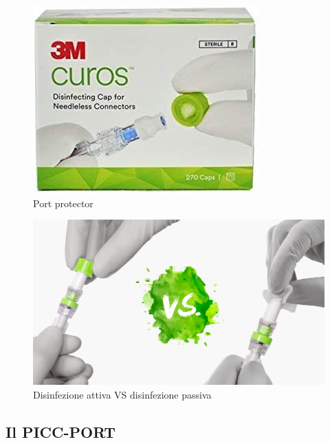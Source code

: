 \begin{figure}[H]
    \begin{center}
    \includegraphics[width=0.4\columnwidth]{img/portprotectors.jpg}
    \end{center}
    \caption[Port protector]{Port protector
    \cite{img47}}

\end{figure}

\begin{figure}[H]
    \begin{center}
    \includegraphics[width=0.6\columnwidth]{img/converted.png}
    \end{center}
    \caption[Disinfezione attiva VS disinfezione passiva]{Disinfezione attiva VS disinfezione passiva
    \cite{img47BIS}}

\end{figure}

\subsection{Il PICC-PORT}

